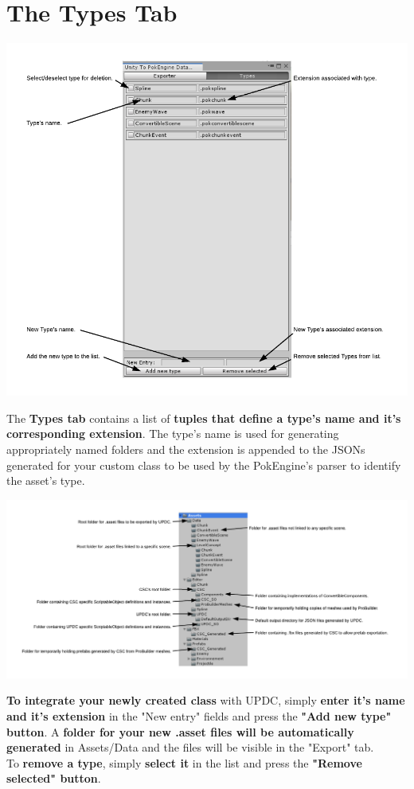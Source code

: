 \documentclass[10pt,a4paper]{article}
\begin{document}
\section{The Types Tab}
\begin{center}
\includegraphics[scale=0.55]{typesUi}
\end{center}
The \textbf{Types tab} contains a list of \textbf{tuples that define a type's name and it's corresponding extension}.
The type's name is used for generating appropriately named folders and the extension is appended to the JSONs generated for your custom class to be used by the PokEngine's parser to identify the asset's type.
\begin{center}
\includegraphics[scale=0.55]{folderUPDC}
\end{center}
\textbf{To integrate your newly created class} with UPDC, simply \textbf{enter it's name and it's extension} in the "New entry" fields and press the \textbf{"Add new type" button}.
A \textbf{folder for your new .asset files will be automatically generated} in Assets/Data and the files will be visible in the "Export" tab.\\
To \textbf{remove a type}, simply \textbf{select it} in the list and press the \textbf{"Remove selected" button}.
\end{document}
